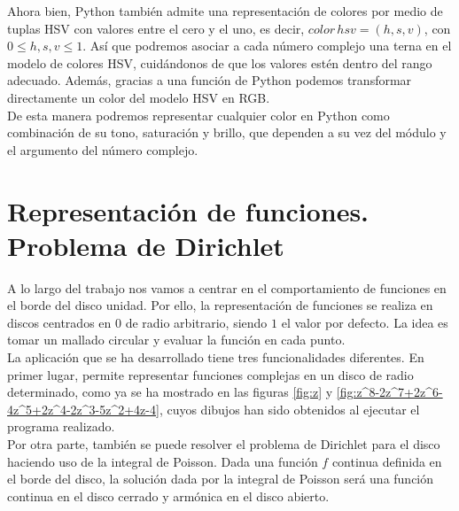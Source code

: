 Ahora bien, Python también admite una representación de colores por medio de tuplas HSV con valores entre el cero y el uno, es decir, $color \, hsv = (h, s, v)$, con $0 \leq h, s, v \leq 1$. Así que podremos asociar a cada número complejo una terna en el modelo de colores HSV, cuidándonos de que los valores estén dentro del rango adecuado. Además, gracias a una función de Python podemos transformar directamente un color del modelo HSV en RGB. \\

De esta manera podremos representar cualquier color en Python como combinación de su tono, saturación y brillo, que dependen a su vez del módulo y el argumento del número complejo. \\


\section{Representación de funciones. Problema de Dirichlet}

A lo largo del trabajo nos vamos a centrar en el comportamiento de funciones en el borde del disco unidad. Por ello, la representación de funciones se realiza en discos centrados en $0$ de radio arbitrario, siendo $1$ el valor por defecto. La idea es tomar un mallado circular y evaluar la función en cada punto. \\

La aplicación que se ha desarrollado tiene tres funcionalidades diferentes. En primer lugar, permite representar funciones complejas en un disco de radio determinado, como ya se ha mostrado en las figuras \ref{fig:z} y \ref{fig:z^8-2z^7+2z^6-4z^5+2z^4-2z^3-5z^2+4z-4}, cuyos dibujos han sido obtenidos al ejecutar el programa realizado. \\

Por otra parte, también se puede resolver el problema de Dirichlet para el disco haciendo uso de la integral de Poisson. Dada una función $f$ continua definida en el borde del disco, la solución dada por la integral de Poisson será una función continua en el disco cerrado y armónica en el disco abierto. \\


